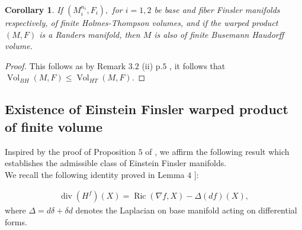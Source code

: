 \documentclass[pdflatex,sn-mathphys-num]{sn-jnl}%
\newtheorem{corollary}{Corollary}[section]
\theoremstyle{thmstyleone}%
\theoremstyle{thmstyletwo}%
\theoremstyle{thmstylethree}%
\begin{document}
 

\begin{corollary}If $(M_i^{n_i}, F_i),$  for $i = 1,2$ be base and fiber Finsler manifolds respectively, of finite Holmes-Thompson volumes, and if the warped product $(M,F)$ is a Randers manifold,  then  $M$ is also of finite  Busemann Haudorff volume.
  \end{corollary} 
  
\begin{proof}
 This follows as by  Remark $3.2$ (ii)  p.$5$
\cite{sc},
it follows that $\operatorname{Vol}_{BH}(M,F)\leq \operatorname{Vol}_{HT}(M,F)$.
\end{proof}
 




\subsection{Existence  of Einstein Finsler warped product of finite volume}\label{sec3.3}
  Inspired by the  proof of Proposition $5$ of \cite{kim},
  we affirm the following result which  establishes 
  the admissible class of Einstein Finsler manifolds.\\
  
 We recall the following identity proved in Lemma
$4$ \textbf{\cite[\boldmath p. $2574$]{kim}}]:

\begin{align} 
			{\operatorname{div}(H^f)}(X)=\operatorname{Ric}(\nabla f,X)-\Delta (df)(X),\label{f14}
		\end{align}
  where $\Delta=d\delta+\delta d$ denotes the Laplacian on base manifold acting on differential forms.




  \vspace{0.15in}
	
\end{document}
